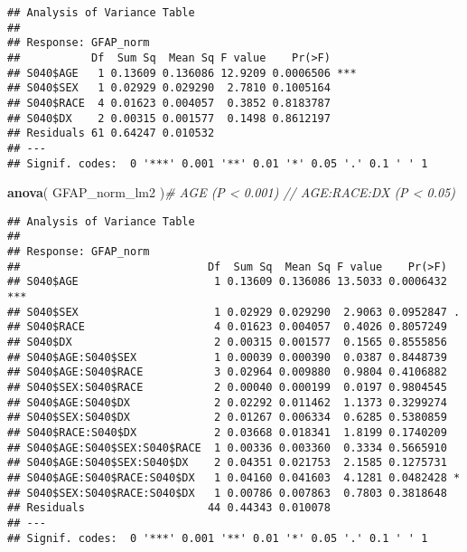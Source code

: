 \documentclass[]{article}
\newenvironment{Shaded}{\begin{snugshade}}{\end{snugshade}}
\newcommand{\CommentTok}[1]{\textcolor[rgb]{0.56,0.35,0.01}{\textit{#1}}}
\newcommand{\KeywordTok}[1]{\textcolor[rgb]{0.13,0.29,0.53}{\textbf{#1}}}
\newcommand{\NormalTok}[1]{#1}
\begin{document}
\begin{Shaded}
\begin{Highlighting}[]
{\CommentTok{#######################}

\KeywordTok{anova}\NormalTok{(  GFAP_norm_lm1   )}\CommentTok{# AGE (P < 0.001)}
\end{Highlighting}
\end{Shaded}

\begin{verbatim}
## Analysis of Variance Table
## 
## Response: GFAP_norm
##           Df  Sum Sq  Mean Sq F value    Pr(>F)    
## S040$AGE   1 0.13609 0.136086 12.9209 0.0006506 ***
## S040$SEX   1 0.02929 0.029290  2.7810 0.1005164    
## S040$RACE  4 0.01623 0.004057  0.3852 0.8183787    
## S040$DX    2 0.00315 0.001577  0.1498 0.8612197    
## Residuals 61 0.64247 0.010532                      
## ---
## Signif. codes:  0 '***' 0.001 '**' 0.01 '*' 0.05 '.' 0.1 ' ' 1
\end{verbatim}

\begin{Shaded}
\begin{Highlighting}[]
\KeywordTok{anova}\NormalTok{(  GFAP_norm_lm2   )}\CommentTok{# AGE (P < 0.001) // AGE:RACE:DX (P < 0.05)}
\end{Highlighting}
\end{Shaded}

\begin{verbatim}
## Analysis of Variance Table
## 
## Response: GFAP_norm
##                             Df  Sum Sq  Mean Sq F value    Pr(>F)    
## S040$AGE                     1 0.13609 0.136086 13.5033 0.0006432 ***
## S040$SEX                     1 0.02929 0.029290  2.9063 0.0952847 .  
## S040$RACE                    4 0.01623 0.004057  0.4026 0.8057249    
## S040$DX                      2 0.00315 0.001577  0.1565 0.8555856    
## S040$AGE:S040$SEX            1 0.00039 0.000390  0.0387 0.8448739    
## S040$AGE:S040$RACE           3 0.02964 0.009880  0.9804 0.4106882    
## S040$SEX:S040$RACE           2 0.00040 0.000199  0.0197 0.9804545    
## S040$AGE:S040$DX             2 0.02292 0.011462  1.1373 0.3299274    
## S040$SEX:S040$DX             2 0.01267 0.006334  0.6285 0.5380859    
## S040$RACE:S040$DX            2 0.03668 0.018341  1.8199 0.1740209    
## S040$AGE:S040$SEX:S040$RACE  1 0.00336 0.003360  0.3334 0.5665910    
## S040$AGE:S040$SEX:S040$DX    2 0.04351 0.021753  2.1585 0.1275731    
## S040$AGE:S040$RACE:S040$DX   1 0.04160 0.041603  4.1281 0.0482428 *  
## S040$SEX:S040$RACE:S040$DX   1 0.00786 0.007863  0.7803 0.3818648    
## Residuals                   44 0.44343 0.010078                      
## ---
## Signif. codes:  0 '***' 0.001 '**' 0.01 '*' 0.05 '.' 0.1 ' ' 1
\end{verbatim}
\end{document}
